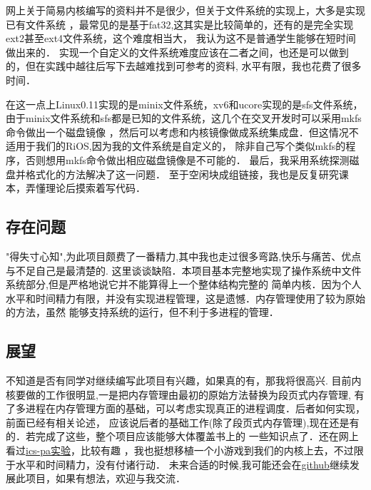 网上关于简易内核编写的资料并不是很少，但关于文件系统的实现上，大多是实现已有文件系统
，最常见的是基于fat32,这其实是比较简单的，还有的是完全实现ext2甚至ext4文件系统，这个难度相当大，
我认为这不是普通学生能够在短时间做出来的．
实现一个自定义的文件系统难度应该在二者之间，也还是可以做到的，但在实践中越往后写下去越难找到可参考的资料,
水平有限，我也花费了很多时间．

在这一点上Linux0.11实现的是minix文件系统，xv6和ucore实现的是sfs文件系统，
由于minix文件系统和sfs都是已知的文件系统，这几个在交叉开发时可以采用mkfs命令做出一个磁盘镜像
，然后可以考虑和内核镜像做成系统集成盘．但这情况不适用于我们的RiOS,因为我的文件系统是自定义的，
除非自己写个类似mkfs的程序，否则想用mkfs命令做出相应磁盘镜像是不可能的．
最后，我采用系统探测磁盘并格式化的方法解决了这一问题．
至于空闲块成组链接，我也是反复研究课本，弄懂理论后摸索着写代码．

\subsection{存在问题}

"得失寸心知",为此项目颇费了一番精力,其中我也走过很多弯路,快乐与痛苦、优点与不足自己是最清楚的.
这里谈谈缺陷．本项目基本完整地实现了操作系统中文件系统部分,但是严格地说它并不能算得上一个整体结构完整的
简单内核．因为个人水平和时间精力有限，并没有实现进程管理，这是遗憾．内存管理使用了较为原始的方法，虽然
能够支持系统的运行，但不利于多进程的管理．

\subsection{展望}

不知道是否有同学对继续编写此项目有兴趣，如果真的有，那我将很高兴.
目前内核要做的工作很明显,一是把内存管理由最初的原始方法替换为段页式内存管理,
有了多进程在内存管理方面的基础，可以考虑实现真正的进程调度．后者如何实现，前面已经有相关论述，
应该说后者的基础工作(除了段页式内存管理),现在还是有的．若完成了这些，整个项目应该能够大体覆盖书上的
一些知识点了．还在网上看过\href{https://legacy.gitbook.com/book/nju-ics/ics2017-programming-assignment/details}{ics-pa实验}，比较有趣
，我也挺想移植一个小游戏到我们的内核上去，不过限于水平和时间精力，没有付诸行动．
未来合适的时候,我可能还会在\href{https://github.com/Twopothead/baby-rios}{github}继续发展此项目，如果有想法，欢迎与我交流．






